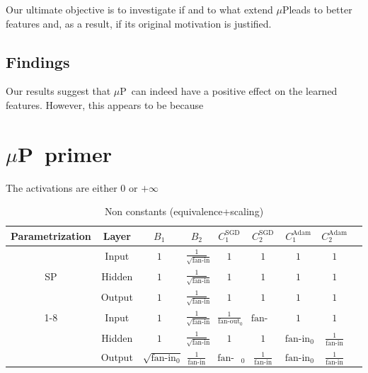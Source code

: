 \documentclass{article}
\newcommand{\mup}{$\mu$P}
\newcommand{\fanin}{\text{fan-in}}
\newcommand{\fanout}{\text{fan-out}}
\begin{document}
Our ultimate objective is to investigate if and to what extend \mup leads to better features and, as a result, if its original motivation is justified.

\subsection{Findings}


Our results suggest that \mup\ can indeed have a positive effect on the learned features. However, this appears to be because


\section{\mup\ primer}
The activations are either $0$ or $+\infty$
\begin{table}[h!]
\footnotesize
\Centering
\begin{tabular}{ccccccccp{10em}}
\toprule
Parametrization & Layer & $B_1$ & $B_2$ & $C^{\text{SGD}}_1$ & $C^{\text{SGD}}_2$ & $C^{\text{Adam}}_1$ & $C^{\text{Adam}}_2$\\
\midrule
\multirow{3}{*}{SP} & Input & $1$ & $\frac{1}{\sqrt{\fanin}}$ & $1$ & $1$ & $1$ & $1$\\
& Hidden & $1$ & $\frac{1}{\sqrt{\fanin}}$ & $1$ & $1$ & $1$ & $1$\\
& Output & $1$ & $\frac{1}{\sqrt{\fanin}}$ & $1$ & $1$ & $1$ & $1$\\
\cmidrule{1-8}
\multirow{3}{*}{$\mu$P} & Input & $1$ & $\frac{1}{\sqrt{\fanin}}$ & $\frac{1}{\fanout_0}$ & $\fanout$ & $1$ & $1$ \\
& Hidden & $1$ & $\frac{1}{\sqrt{\fanin}}$ & $1$ & $1$ & $\fanin_0$ & $\frac{1}{\fanin}$\\
& Output & $\sqrt{\fanin_0}$ & $\frac{1}{\fanin}$ & $\fanin_0$ & $\frac{1}{\fanin}$ & $\fanin_0$ & $\frac{1}{\fanin}$\\
\bottomrule
\end{tabular}
\caption{Non constants (equivalence+scaling)}
\end{table}
\end{document}

